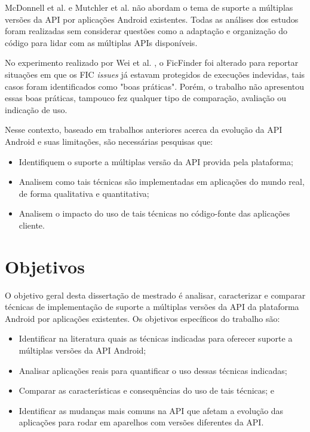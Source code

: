 McDonnell et al. \cite{McDonnell2013} e Mutchler et al. \cite{Mutchler2016}
não abordam o tema de suporte a múltiplas versões da API
por aplicações Android existentes. Todas as análises dos estudos foram
realizadas sem considerar questões como a adaptação e organização do código para
lidar com as múltiplas APIs disponíveis.

No experimento realizado por Wei et al. \cite{Wei2016}, o FicFinder foi
alterado para reportar situações em que os FIC \textit{issues} já estavam protegidos
de execuções indevidas, tais casos foram identificados como "boas práticas". Porém,
o trabalho não apresentou essas boas práticas, tampouco fez qualquer tipo de
comparação, avaliação ou indicação de uso.

Nesse contexto, baseado em trabalhos anteriores acerca da evolução da API Android
e suas limitações, são necessárias pesquisas que:
\begin{itemize}
    \item Identifiquem o suporte a múltiplas versão da API provida pela plataforma;
    \item Analisem como tais técnicas são implementadas em aplicações do mundo
        real, de forma qualitativa e quantitativa;
    \item Analisem o impacto do uso de tais técnicas no código-fonte das aplicações
        cliente.   
\end{itemize}

\section{Objetivos} \label{sec:objetivos-gerais-especificos}

O objetivo geral desta dissertação de mestrado é analisar, caracterizar e comparar
técnicas de implementação de suporte a múltiplas versões da API da plataforma
Android por aplicações existentes. Os objetivos específicos do trabalho são:
\begin{itemize}
	\item Identificar na literatura quais as técnicas indicadas para oferecer suporte
	a múltiplas versões da API Android;
	\item Analisar aplicações reais para quantificar o uso dessas técnicas indicadas;
	\item Comparar as características e consequências do uso de tais técnicas; e
	\item Identificar as mudanças mais comuns na API que afetam a evolução das
	aplicações para rodar em aparelhos com versões diferentes da API.
\end{itemize}

